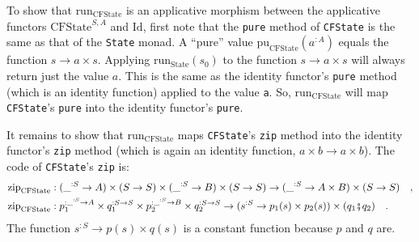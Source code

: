To show that $\text{run}_{\text{CFState}}$ is an applicative morphism
between the applicative functors $\text{CFState}^{S,A}$ and $\text{Id}$,
first note that the \lstinline!pure! method of \lstinline!CFState!
is the same as that of the \lstinline!State! monad. A \textsf{``}pure\textsf{''}
value $\text{pu}_{\text{CFState}}(a^{:A})$ equals the function $s\rightarrow a\times s$.
Applying $\text{run}_{\text{State}}(s_{0})$ to the function $s\rightarrow a\times s$
will always return just the value $a$. This is the same as the identity
functor\textsf{'}s \lstinline!pure! method (which is an identity function)
applied to the value \lstinline!a!. So, $\text{run}_{\text{CFState}}$
will map \lstinline!CFState!\textsf{'}s \lstinline!pure! into the identity
functor\textsf{'}s \lstinline!pure!.

It remains to show that $\text{run}_{\text{CFState}}$ maps \lstinline!CFState!\textsf{'}s
\lstinline!zip! method into the identity functor\textsf{'}s \lstinline!zip!
method (which is again an identity function, $a\times b\rightarrow a\times b$).
The code of \lstinline!CFState!\textsf{'}s \lstinline!zip! is:
\begin{align*}
 & \text{zip}_{\text{CFState}}:(\_^{:S}\rightarrow A)\times(S\rightarrow S)\times(\_^{:S}\rightarrow B)\times(S\rightarrow S)\rightarrow(\_^{:S}\rightarrow A\times B)\times(S\rightarrow S)\quad,\\
 & \text{zip}_{\text{CFState}}:p_{1}^{:\_^{:S}\rightarrow A}\times q_{1}^{:S\rightarrow S}\times p_{2}^{:\_^{:S}\rightarrow B}\times q_{2}^{:S\rightarrow S}\rightarrow(s^{:S}\rightarrow p_{1}(s)\times p_{2}(s))\times(q_{1}\bef q_{2})\quad.
\end{align*}
The function $s^{:S}\rightarrow p(s)\times q(s)$ is a constant function
because $p$ and $q$ are.

